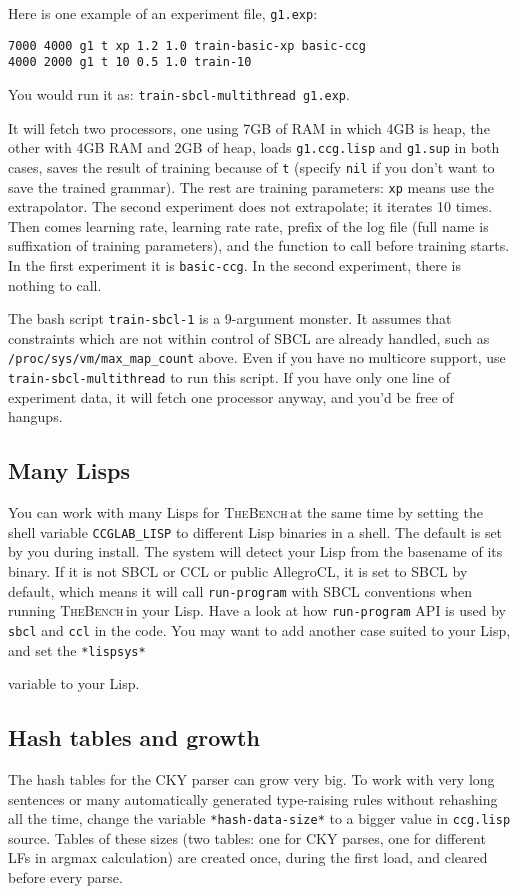 \documentclass[11pt]{article}
\newcommand{\tool}{\textsc{TheBench}}
\begin{document}
{{Here is one example of an experiment file, \verb+g1.exp+:
\begin{verbatim}
7000 4000 g1 t xp 1.2 1.0 train-basic-xp basic-ccg
4000 2000 g1 t 10 0.5 1.0 train-10
\end{verbatim}

You would run it as: \verb+train-sbcl-multithread g1.exp+.

It will fetch two processors, one using 7GB of RAM 	in which 4GB is heap, the other with 4GB RAM and 2GB of heap, loads \verb+g1.ccg.lisp+ and \verb+g1.sup+ in both cases, saves the result of training
because of \verb+t+ (specify \verb+nil+ if you don't want to save the trained grammar). The rest are training parameters: \verb+xp+ means
use the extrapolator. The second experiment does not extrapolate; it iterates 10 times. Then comes learning rate, learning rate rate, prefix of the log file (full name is suffixation of training parameters), and the function to call before training starts. In the first experiment it is \verb+basic-ccg+. In the second experiment,
there is nothing to call.

{The bash script} \verb|train-sbcl-1| {is a 9-argument monster}.
It assumes that constraints which are not within control of SBCL are already handled,
such as \verb|/proc/sys/vm/max_map_count| {above}. {Even if you have no multicore support, use} \verb|train-sbcl-multithread|
{to run this script. If you have only one line of experiment data, it will fetch one processor anyway, and you'd be free of hangups.}


\subsection{Many Lisps}
You can work with many Lisps for \tool\,at the same time by setting the shell variable \texttt{CCGLAB\_LISP} to
different Lisp binaries in a shell. The default is set by you during install.
{The system will detect your Lisp from the basename of its binary. If it is not SBCL or CCL or public AllegroCL, it is set to SBCL by default, which means
it will call} \verb|run-program| {with SBCL conventions when running \tool\,in your Lisp.
Have a look at how} \verb|run-program| {API is used
by \verb+sbcl+ and \verb|ccl| in the code. You may want to add another case suited to your Lisp, and set the} \verb|*lispsys*| {variable to your Lisp. 

\subsection{Hash tables and growth}
{The hash tables for the CKY parser can grow very big. To work with very long sentences  or {many automatically generated type-raising rules}
without rehashing all the time, change the variable \texttt{*hash-data-size*} to a bigger value in \texttt{ccg.lisp} source.
Tables of these sizes (two tables: one for CKY parses, one for different LFs in argmax calculation) are created once, during the first load, and cleared before every parse. 

}}}}
\end{document}
